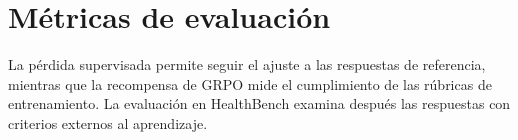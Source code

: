 \section{Métricas de evaluación}
\label{sec:metodo-metricas}
La pérdida supervisada permite seguir el ajuste a las respuestas de referencia, mientras que la recompensa de GRPO mide el cumplimiento de las rúbricas de entrenamiento. La evaluación en HealthBench examina después las respuestas con criterios externos al aprendizaje.




